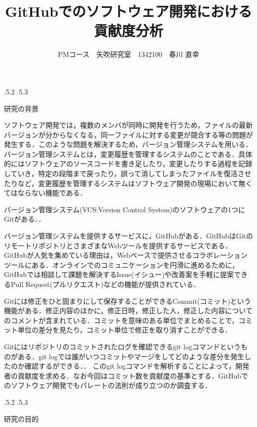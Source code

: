 \documentclass[uplatex]{jsarticle}
\title{\vspace{-14mm}GitHubでのソフトウェア開発における貢献度分析}
\author{PMコース　矢吹研究室　1342100　春川 直幸}
\date{}%
\makeatletter
\renewcommand{\section}{%
    \if@slide\clearpage\fi
    \@startsection{section}{1}{\z@}%
    {\Cvs \@plus.5\Cdp \@minus.2\Cdp}%
    {.5\Cvs \@plus.3\Cdp}%
    {\normalfont\raggedright}}
\makeatother
\begin{document}
\maketitle





\section{研究の背景}

ソフトウェア開発では，複数のメンバが同時に開発を行うため，ファイルの最新バージョンが分からなくなる，同一ファイルに対する変更が競合する等の問題が発生する．このような問題を解決するため，バージョン管理システムを用いる\cite{ikeda2014}．バージョン管理システムとは，変更履歴を管理するシステムのことである．具体的にはソフトウェアのソースコードを書き足したり，変更したりする過程を記録していき，特定の段階まで戻ったり，誤って消してしまったファイルを復活させたりなど，変更履歴を管理するシステムはソフトウェア開発の現場において無くてはならない機能である\cite{otuka2014}．

バージョン管理システム(VCS:Version Control System)のソフトウェアの1つにGitがある．\cite{shioya2014}．

バージョン管理システムを提供するサービスに，GitHubがある．GitHubはGitのリモートリポジトリとさまざまなWebツールを提供するサービスである．GitHubが人気を集めている理由は，Webベースで提供させるコラボレーションツールにある．オンラインでのコミュニケーションを円滑に進めるために，GitHubでは相談して課題を解決するIssue(イシュー)や改善案を手軽に提案できるPull Request(プルリクエスト)などの機能が提供されている\cite{shioya2014}．

Gitには修正をひと固まりにして保存することができるCommit(コミット)という機能がある．修正内容のほかに，修正日時，修正した人，修正した内容についてのコメントが含まれている．コミットを意味のある単位でまとめることで，コミット単位の差分を見たり，コミット単位で修正を取り消すことができる\cite{shioya2014}．

Gitにはリポジトリのコミットされたログを確認できるgit logコマンドというものがある．git logでは誰がいつコミットやマージをしてどのような差分を発生したのか確認するができる．\cite{otuka2014}．
このgit logコマンドを解析することによって，開発者の貢献度を求める．なお今回はコミット数を貢献度の基準とする．GitHubでのソフトウェア開発でもパレートの法則が成り立つのか調査する．

\section{研究の目的}
\end{document}
